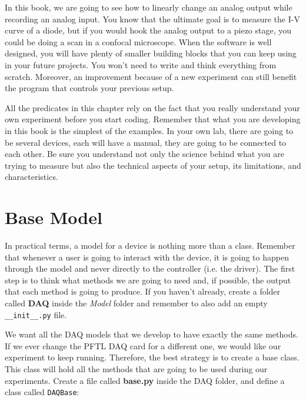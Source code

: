 In this book, we are going to see how to linearly change an analog output while recording an analog input. You know that the ultimate goal is to measure the I-V curve of a diode, but if you would hook the analog output to a piezo stage, you could be doing a scan in a confocal microscope. When the software is well designed, you will have plenty of smaller building blocks that you can keep using in your future projects. You won't need to write and think everything from scratch. Moreover, an improvement because of a new experiment can still benefit the program that controls your previous setup. 

All the predicates in this chapter rely on the fact that you really understand your own experiment before you start coding. Remember that what you are developing in this book is the simplest of the examples. In your own lab, there are going to be several devices, each will have a manual, they are going to be connected to each other. Be sure you understand not only the science behind what you are trying to measure but also the technical aspects of your setup, its limitations, and characteristics. 


\section{Base Model}\label{basemodel}
In practical terms, a model for a device is nothing more than a class. Remember that whenever a user is going to interact with the device, it is going to happen through the model and never directly to the controller (i.e. the driver). The first step is to think what methods we are going to need and, if possible, the output that each method is going to produce. If you haven't already, create a folder called \textbf{DAQ} inside the \emph{Model} folder and remember to also add an empty \texttt{\_\_init\_\_.py} file. 

We want all the DAQ models that we develop to have exactly the same methods. If we ever change the PFTL DAQ card for a different one, we would like our experiment to keep running. Therefore, the best strategy is to create a base class. This class will hold all the methods that are going to be used during our experiments. Create a file called \textbf{base.py} inside the DAQ folder, and define a class called \texttt{DAQBase}:

